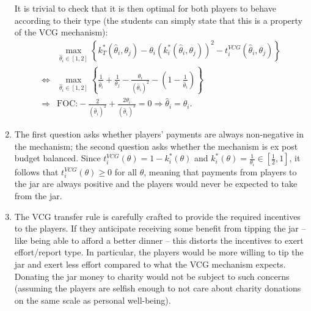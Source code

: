 \documentclass[a4paper]{article}
\newif\ifsolutions
\begin{document}
\begin{enumerate}
	It is trivial to check that it is then optimal for both players to behave according to their type (the students can simply state that this is a property of the VCG mechanism):
	\begin{align*}
		&\max_{\hat{\theta}_i \in [1,2]} \left\{ k^*_T(\hat{\theta}_i,\theta_j) - \theta_i (k^*_i(\hat{\theta}_i,\theta_j))^2 - t_i^{VCG}(\hat{\theta}_i,\theta_j) \right\}
		\\ \iff
		&\max_{\hat{\theta}_i \in [1,2]} \left\{ \frac{1}{\hat{\theta}_i} + \frac{1}{\theta_j} - \frac{\theta_i}{\left(\hat{\theta}_i \right)^2} - \left( 1 - \frac{1}{\hat{\theta}_i} \right) \right\}
		\\ \Rightarrow
		&\text{FOC:} -\frac{2}{\left( \hat{\theta}_i \right)^2} + \frac{2\theta_i}{\left( \hat{\theta}_i \right)^3} = 0
		\Rightarrow \hat{\theta}_i = \theta_i.
	\end{align*}

	\item The first question asks whether players' payments are always non-negative in the mechanism; the second question asks whether the mechanism is ex post budget balanced. Since $t_i^{VCG}(\theta) = 1-k^*_i(\theta)$ and $k_i^*(\theta) = \frac{1}{\theta_i} \in \left[ \frac{1}{2}, 1 \right]$, it follows that $t_i^{VCG}(\theta) \geq 0$ for all $\theta$, meaning that payments from players to the jar are always positive and the players would never be expected to take from the jar.
	
	\item The VCG transfer rule is carefully crafted to provide the required incentives to the players. If they anticipate receiving some benefit from tipping the jar -- like being able to afford a better dinner -- this distorts the incentives to exert effort/report type. In particular, the players would be more willing to tip the jar and exert less effort compared to what the VCG mechanism expects. Donating the jar money to charity would not be subject to such concerns (assuming the players are selfish enough to not care about charity donations on the same scale as personal well-being).
\end{enumerate}
\fi



%
%
%
\end{document}
